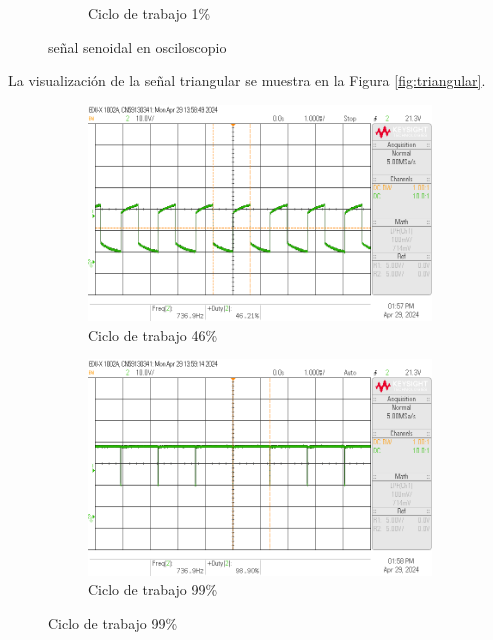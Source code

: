 \documentclass{article}
\begin{document}
\begin{figure}[H]
\begin{subfigure}{.3\textwidth}
        \caption{Ciclo de trabajo 1\%}
        \label{fig:senoidal_3}
    \end{subfigure}
    \caption{señal senoidal en osciloscopio}
    \label{fig:senoidal}
\end{figure}
La visualización de la señal triangular se muestra en la Figura \ref{fig:triangular}.

\begin{figure}[H]
    \centering
    \begin{subfigure}{.3\textwidth}
        \centering
        \includegraphics[width=\linewidth]{images/scope_1.png}
        \caption{Ciclo de trabajo 46\%}
        \label{fig:triangular_1}
    \end{subfigure}
    \hfill
    \begin{subfigure}{.3\textwidth}
        \centering
        \includegraphics[width=\linewidth]{images/scope_2.png}
        \caption{Ciclo de trabajo 99\%}
        \label{fig:triangular_2}

\end{subfigure}
\end{figure}
\end{document}
